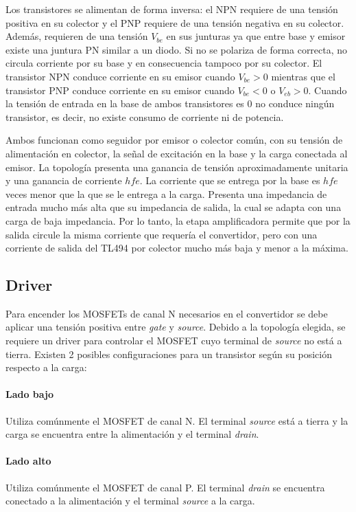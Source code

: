 Los transistores se alimentan de forma inversa: el NPN requiere de una tensión positiva en su colector y el PNP requiere de una tensión negativa en su colector.
Además, requieren de una tensión $V_{be}$ en sus junturas ya que entre base y emisor existe una juntura PN similar a un diodo. 
Si no se polariza de forma correcta, no circula corriente por su base y en consecuencia tampoco por su colector. 
El transistor NPN conduce corriente en su emisor cuando $V_{be}>0$ mientras que el transistor PNP conduce corriente en su emisor cuando $V_{be}<0$ o $V_{eb}>0$.
Cuando la tensión de entrada en la base de ambos transistores es 0 no conduce ningún transistor, es decir, no existe consumo de corriente ni de potencia. 

Ambos funcionan como seguidor por emisor o colector común, con su tensión de alimentación en colector, la señal de excitación en la base y la carga conectada al emisor. 
La topología presenta una ganancia de tensión aproximadamente unitaria y una ganancia de corriente $hfe$. 
La corriente que se entrega por la base es $hfe$ veces menor que la que se le entrega a la carga. 
Presenta una impedancia de entrada mucho más alta que su impedancia de salida, la cual se adapta con una carga de baja impedancia. 
Por lo tanto, la etapa amplificadora permite que por la salida circule la misma corriente que requería el convertidor, pero con una corriente de salida del TL494 por colector mucho más baja y menor a la máxima. 

\subsection{Driver}

Para encender los MOSFETs de canal N necesarios en el convertidor se debe aplicar una tensión positiva entre \textit{gate} y \textit{source}. 
Debido a la topología elegida, se requiere un driver para controlar el MOSFET cuyo terminal de \textit{source} no está a tierra.
Existen 2 posibles configuraciones para un transistor según su posición respecto a la carga:

\paragraph{Lado bajo} Utiliza comúnmente el MOSFET de canal N. 
El terminal \textit{source} está a tierra y la carga se encuentra entre la alimentación y el terminal \textit{drain}. 

\paragraph{Lado alto} Utiliza comúnmente el MOSFET de canal P. 
El terminal \textit{drain} se encuentra conectado a la alimentación y el terminal \textit{source} a la carga.\\

